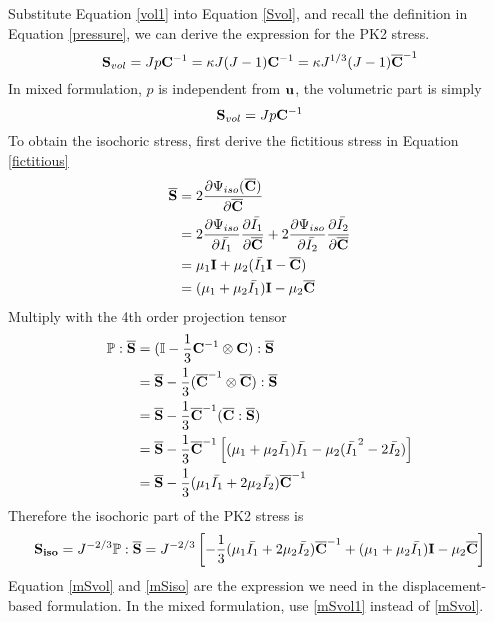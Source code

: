 %
Substitute Equation \ref{vol1} into Equation \ref{Svol}, and recall the definition in Equation \ref{pressure}, we can derive the expression for the PK2 stress.
\begin{equation} \label{mSvol}
\bold{S}_{vol} = Jp\bold{C}^{-1} = \kappa{J(J-1)}\bold{C}^{-1} = \kappa{J^{1/3}(J-1)}\bold{\overline{C}}^{-1}
\end{equation}
In mixed formulation, $p$ is independent from $\bold{u}$, the volumetric part is simply
\begin{equation} \label{mSvol1}
\bold{S}_{vol} = Jp\bold{C}^{-1}
\end{equation}
To obtain the isochoric stress, first derive the fictitious stress in Equation \ref{fictitious}
\begin{equation} \label{mfictitious}
\begin{split}
\overline{\bold{S}} &= 2\frac{\partial\Psi_{iso}({\overline{\bold{C}})}}{\partial\overline{\bold{C}}} \\
&= 2\frac{\partial\Psi_{iso}}{\partial\bar{I_1}} \frac{\partial\bar{I_1}}{\partial\overline{\bold{C}}}  + 2\frac{\partial\Psi_{iso}}{\partial\bar{I_2}} \frac{\partial\bar{I_2}}{\partial\overline{\bold{C}}} \\
&= \mu_1{\bold{I}} + \mu_2({\bar{I_1}\bold{I} - \overline{\bold{C}}}) \\
&= (\mu_1+\mu_2\bar{I_1})\bold{I} - \mu_2{\overline{\bold{C}}}
\end{split}
\end{equation}
Multiply with the 4th order projection tensor
\begin{equation}
\begin{split}
\mathbb{P}:\overline{\bold{S}} &= ( \mathbb{I} - \frac{1}{3}\bold{C}^{-1} \otimes \bold{C} ) : \overline{\bold{S}} \\
&= \overline{\bold{S}} - \frac{1}{3}( \overline{\bold{C}}^{-1} \otimes \overline{\bold{C}} ) : \overline{\bold{S}} \\
&= \overline{\bold{S}} - \frac{1}{3} \overline{\bold{C}}^{-1}  (\overline{\bold{C}} : \overline{\bold{S}}) \\
&= \overline{\bold{S}} - \frac{1}{3} \overline{\bold{C}}^{-1}  \left[(\mu_1+\mu_2\bar{I_1})\bar{I_1} - \mu_2(\bar{I_1}^2-2\bar{I_2})\right]\\
&= \overline{\bold{S}} -  \frac{1}{3}(\mu_1\bar{I_1} + 2\mu_2\bar{I_2}) \overline{\bold{C}}^{-1} 
\end{split}
\end{equation}
Therefore the isochoric part of the PK2 stress is
\begin{equation} \label{mSiso}
\bold{S_{iso}} = J^{-2/3}\mathbb{P}:\overline{\bold{S}} = J^{-2/3}\left[    - \frac{1}{3}(\mu_1\bar{I_1} + 2\mu_2\bar{I_2}) \overline{\bold{C}}^{-1}  + (\mu_1 + \mu_2\bar{I_1})\bold{I} - \mu_2\overline{\bold{C}} \right]
\end{equation}
Equation \ref{mSvol} and \ref{mSiso} are the expression we need in the displacement-based formulation. In the mixed formulation, use \ref{mSvol1} instead of \ref{mSvol}.

